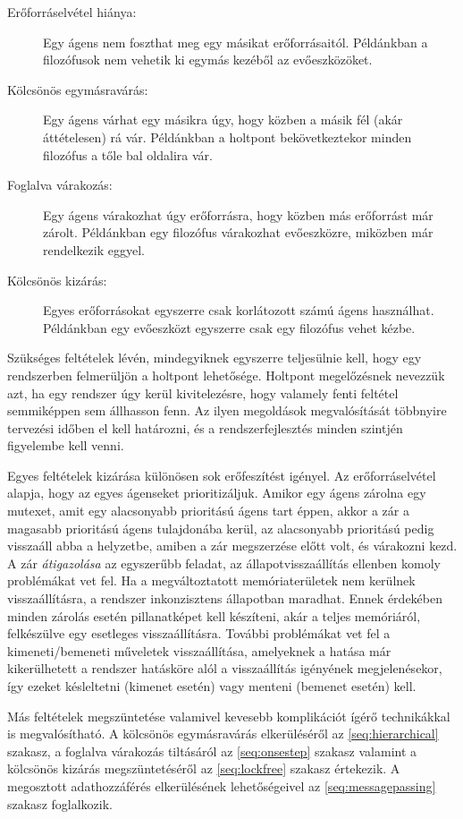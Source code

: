     \begin{description}
    \item[Erőforráselvétel hiánya:] Egy ágens nem foszthat meg egy másikat erőforrásaitól. Példánkban a filozófusok nem vehetik ki egymás kezéből az evőeszközöket.
    \item[Kölcsönös egymásravárás:] Egy ágens várhat egy másikra úgy, hogy közben a másik fél (akár áttételesen) rá vár. Példánkban a holtpont bekövetkeztekor minden filozófus a tőle bal oldalira vár.
    \item[Foglalva várakozás:] Egy ágens várakozhat úgy erőforrásra, hogy közben más erőforrást már zárolt. Példánkban egy filozófus várakozhat evőeszközre, miközben már rendelkezik eggyel.
    \item[Kölcsönös kizárás:] Egyes erőforrásokat egyszerre csak korlátozott számú ágens használhat. Példánkban egy evőeszközt egyszerre csak egy filozófus vehet kézbe.
    \end{description}
%    
    Szükséges feltételek lévén, mindegyiknek egyszerre teljesülnie kell, hogy egy rendszerben felmerüljön a holtpont lehetősége. Holtpont megelőzésnek nevezzük azt, ha egy rendszer úgy kerül kivitelezésre, hogy valamely fenti feltétel semmiképpen sem állhasson fenn. Az ilyen megoldások megvalósítását többnyire tervezési időben el kell határozni, és a rendszerfejlesztés minden szintjén figyelembe kell venni.
    
    Egyes feltételek kizárása különösen sok erőfeszítést igényel. Az erőforráselvétel alapja, hogy az egyes ágenseket prioritizáljuk. Amikor egy ágens zárolna egy mutexet, amit egy alacsonyabb prioritású ágens tart éppen, akkor a zár a magasabb prioritású ágens tulajdonába kerül, az alacsonyabb prioritású pedig visszaáll abba a helyzetbe, amiben a zár megszerzése előtt volt, és várakozni kezd. A zár \emph{átigazolása} az egyszerűbb feladat, az állapotvisszaállítás ellenben komoly problémákat vet fel. Ha a megváltoztatott memóriaterületek nem kerülnek visszaállításra, a rendszer inkonzisztens állapotban maradhat. Ennek érdekében minden zárolás esetén pillanatképet kell készíteni, akár a teljes memóriáról, felkészülve egy esetleges visszaállításra. További problémákat vet fel a kimeneti/bemeneti műveletek visszaállítása, amelyeknek a hatása már kikerülhetett a rendszer hatásköre alól a visszaállítás igényének megjelenésekor, így ezeket késleltetni (kimenet esetén) vagy menteni (bemenet esetén) kell.
    
    Más feltételek megszüntetése valamivel kevesebb komplikációt ígérő technikákkal is megvalósítható. A kölcsönös egymásravárás elkerüléséről az \ref{seq:hierarchical} szakasz, a foglalva várakozás tiltásáról az \ref{seq:onsestep} szakasz valamint a kölcsönös kizárás megszüntetéséről az \ref{seq:lockfree} szakasz értekezik. A megosztott adathozzáférés elkerülésének lehetőségeivel az \ref{seq:messagepassing} szakasz foglalkozik.

